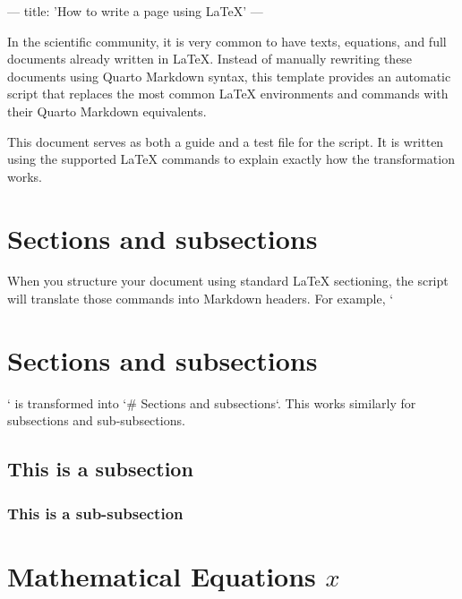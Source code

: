 ---
title: 'How to write a page using LaTeX'
---

In the scientific community, it is very common to have texts, equations, and full documents already written in LaTeX. Instead of manually rewriting these documents using Quarto Markdown syntax, this template provides an automatic script that replaces the most common LaTeX environments and commands with their Quarto Markdown equivalents.

This document serves as both a guide and a test file for the script. It is written using the supported LaTeX commands to explain exactly how the transformation works.

\section{Sections and subsections}

When you structure your document using standard LaTeX sectioning, the script will translate those commands into Markdown headers. For example, `\section{Sections and subsections}‘ is transformed into `# Sections and subsections`. This works similarly for subsections and sub-subsections.

\subsection{This is a subsection}

\subsubsection{This is a sub-subsection}

\section{Mathematical Equations $x$}

